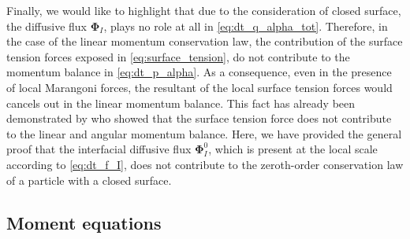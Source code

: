 Finally, we would like to highlight that  due to the consideration of closed surface, the diffusive flux $\mathbf{\Phi}_I$, plays no role at all in \ref{eq:dt_q_alpha_tot}.
Therefore, in the case of the linear momentum conservation law, the contribution of the surface tension forces exposed in \ref{eq:surface_tension}, do not contribute to the momentum balance in \ref{eq:dt_p_alpha}.
As a consequence, even in the presence of local Marangoni forces, the resultant of the local surface tension forces would cancels out in the linear momentum balance.
This fact has already been demonstrated by \citet{hesla1993note} who showed that the surface tension force does not contribute to the linear and angular momentum balance. 
Here, we have provided the general proof that the interfacial diffusive flux $\mathbf{\Phi}_I^0$, which is present at the local scale according to \ref{eq:dt_f_I}, does not contribute to the zeroth-order conservation law of a particle with a closed surface.


\subsection{Moment equations}

